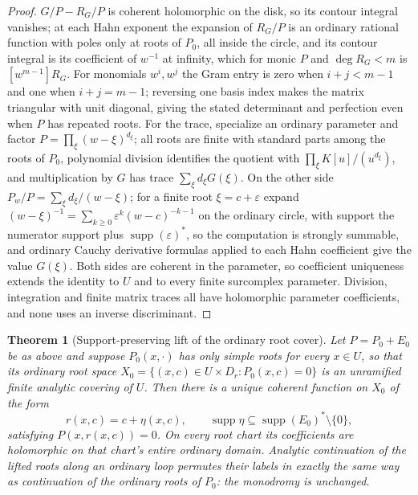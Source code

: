 \documentclass[11pt,letterpaper]{article}
\newtheorem{theorem}{Theorem}[section]
\theoremstyle{definition}
\theoremstyle{remark}
\DeclareMathOperator{\supp}{supp}
\numberwithin{equation}{section}
\begin{document}
\begin{proof}
$G/P-R_G/P$ is coherent holomorphic on the disk, so its contour integral vanishes; at each Hahn exponent the expansion of $R_G/P$ is an ordinary rational function with poles only at roots of $P_0$, all inside the circle, and its contour integral is its coefficient of $w^{-1}$ at infinity, which for monic $P$ and $\deg R_G<m$ is $[w^{m-1}]R_G$. For monomials $w^i,w^j$ the Gram entry is zero when $i+j<m-1$ and one when $i+j=m-1$; reversing one basis index makes the matrix triangular with unit diagonal, giving the stated determinant and perfection even when $P$ has repeated roots. For the trace, specialize an ordinary parameter and factor $P=\prod_\xi(w-\xi)^{d_\xi}$; all roots are finite with standard parts among the roots of $P_0$, polynomial division identifies the quotient with $\prod_\xi K[u]/(u^{d_\xi})$, and multiplication by $G$ has trace $\sum_\xi d_\xi G(\xi)$. On the other side $P_w/P=\sum_\xi d_\xi/(w-\xi)$; for a finite root $\xi=c+\varepsilon$ expand $(w-\xi)^{-1}=\sum_{k\geq0}\varepsilon^k(w-c)^{-k-1}$ on the ordinary circle, with support the numerator support plus $\supp(\varepsilon)^*$, so the computation is strongly summable, and ordinary Cauchy derivative formulas applied to each Hahn coefficient give the value $G(\xi)$. Both sides are coherent in the parameter, so coefficient uniqueness extends the identity to $U$ and to every finite surcomplex parameter. Division, integration and finite matrix traces all have holomorphic parameter coefficients, and none uses an inverse discriminant.
\end{proof}

\begin{theorem}[Support-preserving lift of the ordinary root cover]
\label{finite:thm:monodromy}
Let $P=P_0+E_0$ be as above and suppose $P_0(x,\cdot)$ has only simple roots for every $x\in U$, so that its ordinary root space $X_0=\{(x,c)\in U\times D_r:P_0(x,c)=0\}$ is an unramified finite analytic covering of $U$. Then there is a \emph{unique} coherent function on $X_0$ of the form
\[
 r(x,c)=c+\eta(x,c),
 \qquad \supp\eta\subseteq\supp(E_0)^*\setminus\{0\},
\]
satisfying $P(x,r(x,c))=0$. On every root chart its coefficients are holomorphic on that chart's \emph{entire} ordinary domain. Analytic continuation of the lifted roots along an ordinary loop permutes their labels in exactly the same way as continuation of the ordinary roots of $P_0$: the monodromy is unchanged.
\end{theorem}
\end{document}
